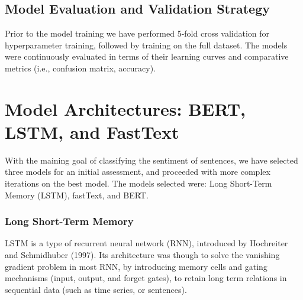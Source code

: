 \documentclass[conference]{IEEEtran}
\begin{document}

\subsection{Model Evaluation and Validation Strategy}

Prior to the model training we have performed 5-fold cross validation for hyperparameter training, followed by training on the full dataset. The models were continuously evaluated in terms of their learning curves and comparative metrics (i.e., confusion matrix, accuracy).





\section{Model Architectures: BERT, LSTM, and FastText}

With the maining goal of classifying the sentiment of sentences, we have selected three models for an initial assessment, and proceeded with more complex iterations on the best model. The models selected were: Long Short-Term Memory (LSTM), fastText, and BERT.

\subsubsection{Long Short-Term  Memory}

LSTM is a type of recurrent neural network (RNN), introduced by Hochreiter and Schmidhuber (1997). Its architecture was though to solve the vanishing gradient problem in most RNN, by introducing memory cells and gating mechanisms (input, output, and forget gates), to retain long term relations in sequential data (such as time series, or sentences).
\end{document}
